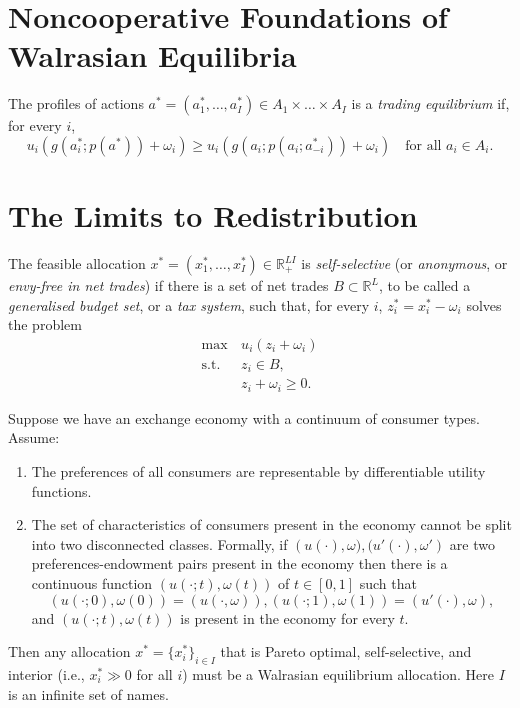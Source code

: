 \section{Noncooperative Foundations of Walrasian Equilibria}

\begin{defn}
    The profiles of actions $a^* = (a^*_1, \dots, a^*_I) \in A_1 \times \dots \times A_I$ is a \emph{trading equilibrium} if, for every $i$,
    \begin{equation*}
        u_i \left( g\left( a^*_i; p(a^*)\right) + \omega_i \right) \geq u_i \left( g\left( a_i; p(a_i; a^*_{-i})\right) + \omega_i \right) \quad \text{for all } a_i \in A_i.
    \end{equation*}
\end{defn}


\section{The Limits to Redistribution}

\begin{defn}
    The feasible allocation $x^* = (x^*_1, \dots, x^*_I) \in \mathbb{R}^{LI}_+$ is \emph{self-selective} (or \emph{anonymous}, or \emph{envy-free in net trades}) if there is a set of net trades $B \subset \mathbb{R}^{L}$, to be called a \emph{generalised budget set}, or a \emph{tax system}, such that, for every $i$, $z^*_i = x^*_i - \omega_i$ solves the problem
    \begin{align*}
        \max \, &u_i(z_i + \omega_i) \\
        \text{s.t. } &z_i \in B, \\
        &z_i + \omega_i \geq 0.
    \end{align*}
\end{defn}

\begin{prop}
    Suppose we have an exchange economy with a continuum of consumer types. Assume:
    \begin{enumerate}
        \item The preferences of all consumers are representable by differentiable utility functions.
        \item The set of characteristics of consumers present in the economy cannot be split into two disconnected classes. Formally, if $\left(u(\cdot), \omega), (u'(\cdot), \omega' \right)$ are two preferences-endowment pairs present in the economy then there is a continuous function $(u(\cdot; t), \omega(t))$ of $t \in [0, 1]$ such that
        \begin{equation*}
            (u(\cdot; 0), \omega(0)) = (u(\cdot, \omega)), (u(\cdot; 1), \omega(1)) = (u'(\cdot), \omega),
        \end{equation*}
        and $(u(\cdot; t), \omega(t))$ is present in the economy for every $t$.
    \end{enumerate}

    Then any allocation $x^* = \{x^*_i\}_{i \in I}$ that is Pareto optimal, self-selective, and interior (i.e., $x^*_i \gg 0$ for all $i$) must be a Walrasian equilibrium allocation. Here $I$ is an infinite set of names.
\end{prop}


